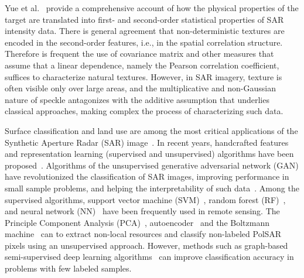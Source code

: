 Yue et al.~\cite{Yue2020Gaussian} provide a comprehensive account of how the physical properties of the target are translated into first- and second-order statistical properties of SAR intensity data.
There is general agreement that non-deterministic textures are encoded in the second-order features, i.e., in the spatial correlation structure.
Therefore is frequent the use of covariance matrix and other measures that assume that a linear dependence, namely the Pearson correlation coefficient, suffices to characterize natural textures.
However, in SAR imagery, texture is often visible only over large areas, and the multiplicative and non-Gaussian nature of speckle antagonizes with the additive assumption that underlies classical approaches, making complex the process of characterizing such data.

Surface classification and land use are among the most critical applications of the Synthetic Aperture Radar (SAR) image~\cite{Pottier2004Unsupervised}.
In recent years, handcrafted features and representation learning (supervised and unsupervised) algorithms have been proposed~\cite{han2020unsupervised, huang2020classification, xie2020polsar}.
Algorithms of the unsupervised generative adversarial network (GAN) have revolutionized the classification of SAR images, improving performance in small sample problems, and helping the interpretability of such data~\cite{liu2019task}.
Among the supervised algorithms, support vector machine (SVM)~\cite{sukawattanavijit2017ga}, random forest (RF)~\cite{mcnairn2014early}, and neural network (NN)~\cite{lin2017deep} have been frequently used in remote sensing.
The Principle Component Analysis (PCA)~\cite{ressel2015neural}, autoencoder~\cite{wang2019classification} and the Boltzmann machine~\cite{qin2017object} can to extract non-local resources and classify non-labeled PolSAR pixels using an unsupervised approach.
However, methods such as graph-based semi-supervised deep learning algorithms~\cite{bi2018graph} can improve classification accuracy in problems with few labeled samples.

